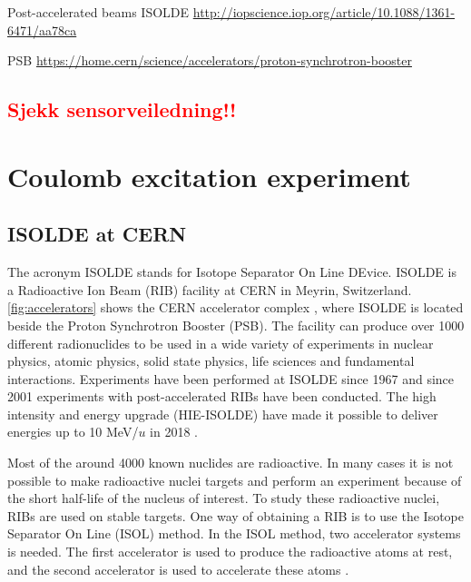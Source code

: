 \documentclass[twoside,english]{uiofysmaster/uiofysmaster}
\let\orgautoref\autoref
\renewcommand{\autoref}
        {\def\equationautorefname{Eq.}%
         \def\figureautorefname{Fig.}%
         \def\subfigureautorefname{Fig.}%
         \def\sectionautorefname{Sec.}%
         \def\subsectionautorefname{Sec.}%
         \def\subsubsectionautorefname{Sec.}%
         \def\Itemautorefname{item}%
         \def\tableautorefname{Tab.}%
         \orgautoref}
\begin{document}
\bigskip

Post-accelerated beams ISOLDE \url{http://iopscience.iop.org/article/10.1088/1361-6471/aa78ca}

\bigskip

PSB \url{https://home.cern/science/accelerators/proton-synchrotron-booster}


\section*{\textcolor{red}{Sjekk sensorveiledning!!}}


\newpage


\chapter{Coulomb excitation experiment} 


\section{ISOLDE at CERN}
The acronym ISOLDE stands for Isotope Separator On Line DEvice. ISOLDE is a Radioactive Ion Beam (RIB) facility at CERN in Meyrin, Switzerland.  \autoref{fig:accelerators} shows the CERN accelerator complex \cite{CERN-AC}, where ISOLDE is located beside the Proton Synchrotron Booster (PSB). The facility can produce over 1000 different radionuclides to be used in a wide variety of experiments in nuclear physics, atomic physics, solid state physics, life sciences and fundamental interactions. Experiments have been performed at ISOLDE since 1967 and since 2001 experiments with post-accelerated RIBs have been conducted. The high intensity and energy upgrade (HIE-ISOLDE) have made it possible to deliver energies up to 10 MeV/$u$ in 2018 \cite{HIE-ISOLDE, ISOLDE-web, ISOLDE-facility}. 

Most of the around 4000 known nuclides are radioactive. In many cases it is not possible to make radioactive nuclei targets and perform an experiment because of the short half-life of the nucleus of interest. To study these radioactive nuclei, RIBs are used on stable targets. One way of obtaining a RIB is to use the Isotope Separator On Line (ISOL) method. In the ISOL method, two accelerator systems is needed. The first accelerator is used to produce the radioactive atoms at rest, and the second accelerator is used to accelerate these atoms \cite{ISOL}. 
\end{document}
